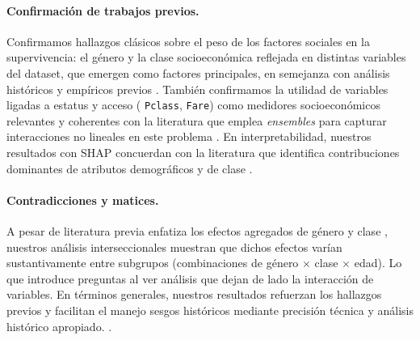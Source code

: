 \documentclass[conference]{IEEEtran}
\begin{document}
\paragraph{Confirmación de trabajos previos.}
Confirmamos hallazgos clásicos sobre el peso de los factores sociales en la supervivencia: el género y la clase socioeconómica reflejada en distintas variables del dataset, que emergen como factores principales, en semejanza con análisis históricos y empíricos previos \cite{hall1986social,smith2018machine}. También confirmamos la utilidad de variables ligadas a estatus y acceso ( \texttt{Pclass}, \texttt{Fare}) como medidores socioeconómicos relevantes y coherentes con la literatura que emplea \emph{ensembles} para capturar interacciones no lineales en este problema \cite{johnson2020ensemble}. En interpretabilidad, nuestros resultados con SHAP concuerdan con la literatura que identifica contribuciones dominantes de atributos demográficos y de clase \cite{lundberg2017unified,molnar2020interpretable}.

\paragraph{Contradicciones y matices.}
A pesar de literatura previa enfatiza los efectos agregados de género y clase \cite{hall1986social,smith2018machine}, nuestros análisis interseccionales muestran que dichos efectos varían sustantivamente entre subgrupos (combinaciones de género $\times$ clase $\times$ edad). Lo que introduce preguntas al ver análisis que dejan de lado la interacción de variables. En términos generales, nuestros resultados refuerzan los hallazgos previos y facilitan el manejo sesgos históricos mediante precisión técnica y análisis histórico apropiado. \cite{barocas2016big,barocas2019fairness,oneill2016weapons}.
\end{document}

